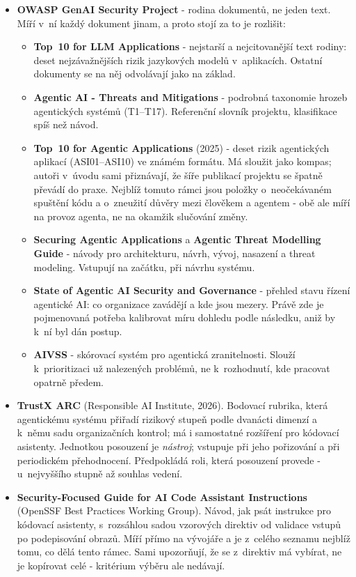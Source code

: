 \begin{itemize}
\item \textbf{OWASP GenAI Security Project} - rodina dokumentů, ne jeden text.
Míří v~ní každý dokument jinam, a proto stojí za to je rozlišit:
  \begin{itemize}
  \item \textbf{Top~10 for LLM Applications} - nejstarší a nejcitovanější text rodiny: deset nejzávažnějších rizik jazykových modelů v~aplikacích. Ostatní dokumenty se na něj odvolávají jako na základ.
  \item \textbf{Agentic AI - Threats and Mitigations} - podrobná taxonomie hrozeb agentických systémů (T1--T17). Referenční slovník projektu, klasifikace spíš než návod.
  \item \textbf{Top~10 for Agentic Applications} (2025) - deset rizik agentických aplikací (ASI01--ASI10) ve známém formátu. Má sloužit jako kompas; autoři v~úvodu sami přiznávají, že šíře publikací projektu se špatně převádí do praxe. Nejblíž tomuto rámci jsou položky o~neočekávaném spuštění kódu a o~zneužití důvěry mezi člověkem a agentem - obě ale míří na provoz agenta, ne na okamžik slučování změny.
  \item \textbf{Securing Agentic Applications} a \textbf{Agentic Threat Modelling Guide} - návody pro architekturu, návrh, vývoj, nasazení a threat modeling. Vstupují na začátku, při návrhu systému.
  \item \textbf{State of Agentic AI Security and Governance} - přehled stavu řízení agentické AI: co organizace zavádějí a kde jsou mezery. Právě zde je pojmenovaná potřeba kalibrovat míru dohledu podle následku, aniž by k~ní byl dán postup.
  \item \textbf{AIVSS} - skórovací systém pro agentická zranitelnosti. Slouží k~prioritizaci už nalezených problémů, ne k~rozhodnutí, kde pracovat opatrně předem.
  \end{itemize}

\item \textbf{TrustX ARC} (Responsible AI Institute, 2026).
Bodovací rubrika, která agentickému systému přiřadí rizikový stupeň podle dvanácti dimenzí a k~němu sadu organizačních kontrol; má i samostatné rozšíření pro kódovací asistenty.
Jednotkou posouzení je \emph{nástroj}; vstupuje při jeho pořizování a při periodickém přehodnocení.
Předpokládá roli, která posouzení provede - u~nejvyššího stupně až souhlas vedení.

\item \textbf{Security-Focused Guide for AI Code Assistant Instructions} (OpenSSF Best Practices Working Group).
Návod, jak psát instrukce pro kódovací asistenty, s~rozsáhlou sadou vzorových direktiv od validace vstupů po podepisování obrazů.
Míří přímo na vývojáře a je z~celého seznamu nejblíž tomu, co dělá tento rámec.
Sami upozorňují, že se z~direktiv má vybírat, ne je kopírovat celé - kritérium výběru ale nedávají.


\end{itemize}
